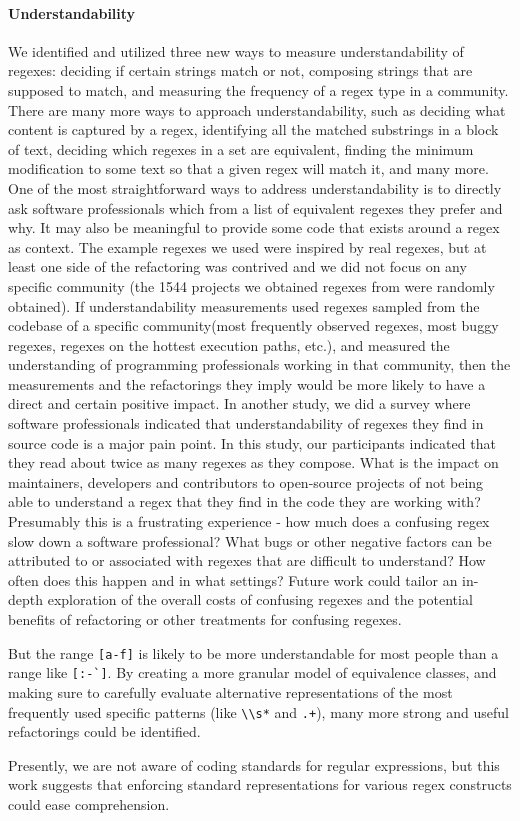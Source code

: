 

\paragraph{Understandability}
We identified and utilized three new ways to measure understandability of regexes: deciding if certain strings match or not, composing strings that are supposed to match, and measuring the frequency of a regex type in a community.  There are many more ways to approach understandability, such as deciding what content is captured by a regex, identifying all the matched substrings in a block of text, deciding which regexes in a set are equivalent, finding the minimum modification to some text so that a given regex will match it, and many more.  One of the most straightforward ways to address understandability is to directly ask software professionals which from a list of equivalent regexes they prefer and why.  It may also be meaningful to provide some code that exists around a regex as context.  The example regexes we used were inspired by real regexes, but at least one side of the refactoring was contrived and we did not focus on any specific community (the 1544 projects we obtained regexes from were randomly obtained).  If understandability measurements used regexes sampled from the codebase of a specific community(most frequently observed regexes, most buggy regexes, regexes on the hottest execution paths, etc.), and measured the understanding of programming professionals working in that community, then the measurements and the refactorings they imply would be more likely to have a direct and certain positive impact.
In another study, we did a survey where software professionals indicated that understandability of regexes they find in source code is a major pain point.  In this study, our participants indicated that they read about twice as many regexes as they compose.  What is the impact on maintainers, developers and contributors to open-source projects of not being able to understand a regex that they find in the code they are working with?  Presumably this is a frustrating experience - how much does a confusing regex slow down a software professional?  What bugs or other negative factors can be attributed to or associated with regexes that are difficult to understand?  How often does this happen and in what settings?  Future work could tailor an in-depth exploration of the overall costs of confusing regexes and the potential benefits of refactoring or other treatments for confusing regexes.


But the range \verb![a-f]! is likely to be more understandable for most people than a range like \verb![:-`]!. By creating a more granular model of equivalence classes, and making sure to carefully evaluate alternative representations of the most frequently used specific patterns (like \verb!\\s*! and \verb!.+!), many more strong and useful refactorings could be identified.

Presently, we are not aware of coding standards for regular expressions, but this work suggests that enforcing standard representations for various regex constructs could ease comprehension.
